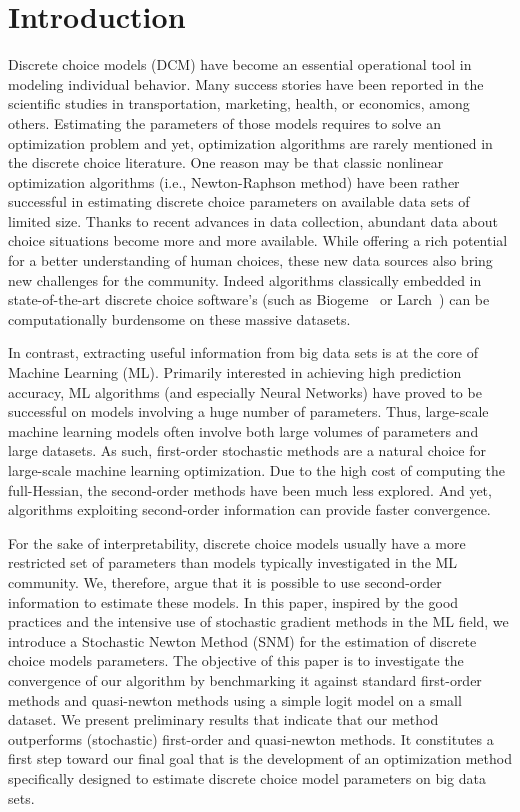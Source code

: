 \documentclass[conference]{IEEEtran}
\begin{document}
\section{Introduction}
\label{sec:intro}

Discrete choice models (DCM) have become an essential operational tool in modeling individual behavior. Many success stories have been reported in the scientific studies in transportation, marketing, health, or economics, among others. Estimating the parameters of those models requires to solve an optimization problem and yet, optimization algorithms are rarely mentioned in the discrete choice literature. One reason may be that classic nonlinear optimization algorithms (i.e., Newton-Raphson method) have been rather successful in estimating discrete choice parameters on available data sets of limited size. Thanks to recent advances in data collection, abundant data about choice situations become more and more available. While offering a rich potential for a better understanding of human choices, these new data sources also bring new challenges for the community. Indeed algorithms classically embedded in state-of-the-art discrete choice software's (such as Biogeme~\cite{bierlaire_biogeme:_2003} or Larch~\cite{newman_computational_2018}) can be computationally burdensome on these massive datasets. 

In contrast, extracting useful information from big data sets is at the core of Machine Learning (ML). Primarily interested in achieving high prediction accuracy, ML algorithms (and especially Neural Networks)  have proved to be successful on models involving a huge number of parameters. Thus, large-scale machine learning models often involve both large volumes of parameters and large datasets. As such, first-order stochastic methods are a natural choice for large-scale machine learning optimization.  Due to the high cost of computing the full-Hessian, the second-order methods have been much less explored. And yet, algorithms exploiting second-order information can provide faster convergence. 

For the sake of interpretability, discrete choice models usually have a more restricted set of parameters than models typically investigated in the ML community. We, therefore, argue that it is possible to use second-order information to estimate these models. In this paper, inspired by the good practices and the intensive use of stochastic gradient methods in the ML field, we introduce a Stochastic Newton Method (SNM) for the estimation of discrete choice models parameters. The objective of this paper is to investigate the convergence of our algorithm by benchmarking it against standard first-order methods and quasi-newton methods using a simple logit model on a small dataset. We present preliminary results that indicate that our method outperforms (stochastic) first-order and quasi-newton methods. It constitutes a first step toward our final goal that is the development of an optimization method specifically designed to estimate discrete choice model parameters on big data sets.
\end{document}

